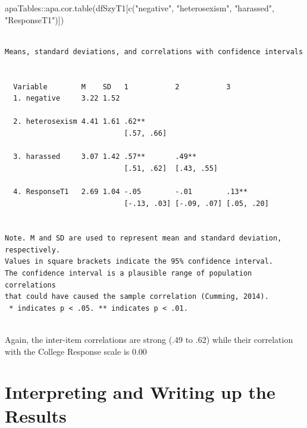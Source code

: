 \documentclass[
  english,
]{book}
\newenvironment{Shaded}{\begin{snugshade}}{\end{snugshade}}
\newcommand{\FunctionTok}[1]{\textcolor[rgb]{0.00,0.00,0.00}{#1}}
\newcommand{\NormalTok}[1]{#1}
\newcommand{\SpecialCharTok}[1]{\textcolor[rgb]{0.00,0.00,0.00}{#1}}
\newcommand{\StringTok}[1]{\textcolor[rgb]{0.31,0.60,0.02}{#1}}
\begin{document}
\begin{Shaded}
\begin{Highlighting}[]
\NormalTok{apaTables}\SpecialCharTok{::}\FunctionTok{apa.cor.table}\NormalTok{(dfSzyT1[}\FunctionTok{c}\NormalTok{(}\StringTok{"negative"}\NormalTok{, }\StringTok{"heterosexism"}\NormalTok{, }\StringTok{"harassed"}\NormalTok{, }\StringTok{"ResponseT1"}\NormalTok{)])}
\end{Highlighting}
\end{Shaded}

\begin{verbatim}

Means, standard deviations, and correlations with confidence intervals
 

  Variable        M    SD   1           2           3         
  1. negative     3.22 1.52                                   
                                                              
  2. heterosexism 4.41 1.61 .62**                             
                            [.57, .66]                        
                                                              
  3. harassed     3.07 1.42 .57**       .49**                 
                            [.51, .62]  [.43, .55]            
                                                              
  4. ResponseT1   2.69 1.04 -.05        -.01        .13**     
                            [-.13, .03] [-.09, .07] [.05, .20]
                                                              

Note. M and SD are used to represent mean and standard deviation, respectively.
Values in square brackets indicate the 95% confidence interval.
The confidence interval is a plausible range of population correlations 
that could have caused the sample correlation (Cumming, 2014).
 * indicates p < .05. ** indicates p < .01.
 
\end{verbatim}

Again, the inter-item correlations are strong (.49 to .62) while their correlation with the College Response scale is 0.00

\hypertarget{interpreting-and-writing-up-the-results}{%
\section{Interpreting and Writing up the Results}\label{interpreting-and-writing-up-the-results}}
\end{document}
